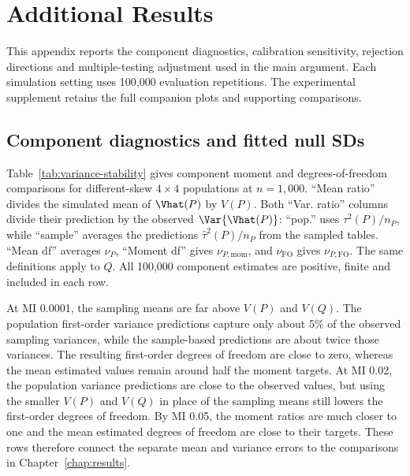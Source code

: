 \chapter{Additional Results}
\label{app:additional-results}

This appendix reports the component diagnostics, calibration sensitivity,
rejection directions and multiple-testing adjustment used in the main
argument. Each simulation setting uses 100,000 evaluation repetitions. The
experimental supplement retains the full companion plots and supporting
comparisons.

\section{Component diagnostics and fitted null SDs}
\label{sec:component-diagnostics}

Table~\ref{tab:variance-stability} gives component moment and
degrees-of-freedom comparisons for different-skew \(4\times4\)
populations at \(n=1{,}000\). ``Mean ratio'' divides the simulated mean
of \(\Vhat(P)\) by \(V(P)\). Both ``Var. ratio'' columns divide their
prediction by the observed \(\Var\{\Vhat(P)\}\): ``pop.'' uses
\(\tau^2(P)/n_P\), while ``sample'' averages the predictions
\(\widehat\tau^2(P)/n_P\) from the sampled tables. ``Mean df'' averages
\(\widehat\nu_P\), ``Moment df'' gives \(\nu_{P,\mathrm{mom}}\), and
\(\nu_{\mathrm{FO}}\) gives \(\nu_{P,\mathrm{FO}}\). The same definitions
apply to \(Q\). All 100,000 component estimates are positive, finite and
included in each row.

\begin{table}[H]
\centering
\small
\setlength{\tabcolsep}{3pt}
\caption{Component moment and degrees-of-freedom comparisons at \(4\times4\), \(n=1{,}000\), different skew.}
\label{tab:variance-stability}

\end{table}

At MI 0.0001, the sampling means are far above \(V(P)\) and \(V(Q)\).
The population first-order variance predictions capture only about 5\%
of the observed sampling variances, while the sample-based predictions
are about twice those variances. The resulting first-order degrees of
freedom are close to zero, whereas the mean estimated values remain
around half the moment targets. At MI 0.02, the population variance
predictions are close to the observed values, but using the smaller
\(V(P)\) and \(V(Q)\) in place of the sampling means still lowers the
first-order degrees of freedom.
By MI 0.05, the moment ratios are much closer to one and the mean
estimated degrees of freedom are close to their targets. These rows
therefore connect the separate mean and variance errors to the
comparisons in Chapter~\ref{chap:results}.


